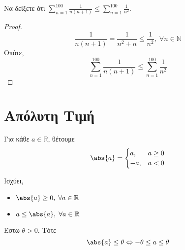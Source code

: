 \documentclass[main.tex]{subfiles}
\begin{document}
\begin{example}
    Να δείξετε ότι $ \sum_{n=1}^{100} \frac{1}{n(n+1)} \leq \sum_{n=1}^{100}
    \frac{1}{n^{2}} $.
\end{example}

\begin{proof}
    \[
        \frac{1}{n(n+1)} = \frac{1}{n^{2}+n} \leq \frac{1}{n^{2}} ,\; 
        \forall n \in \mathbb{N} 
    \] 
    Οπότε,
    \[
        \sum_{n=1}^{100} \frac{1}{n(n+1)} \leq \sum_{n=1}^{100} 
        \frac{1}{n^{2}}
    \]
\end{proof}

\section{Απόλυτη Τιμή}

\begin{dfn}
    Για κάθε $ a \in \mathbb{R} $, θέτουμε
    \[ \abs{a} = \begin{cases} a, & a \geq 0 \\ -a, & a < 0 \end{cases}  \] 
\end{dfn}

\begin{rem}
    Ισχύει, 
    \begin{itemize}
        \item  $ \abs{a} \geq 0, \;  \forall a \in \mathbb{R} $
        \item $ a \leq \abs{a}, \; \forall a \in \mathbb{R} $
    \end{itemize}
\end{rem}

\begin{prop}
    Έστω $ \theta > 0 $. Τότε 
    \[
        \abs{a} \leq \theta \Leftrightarrow - \theta \leq a \leq \theta  
    \]
\end{prop}
\end{document}
